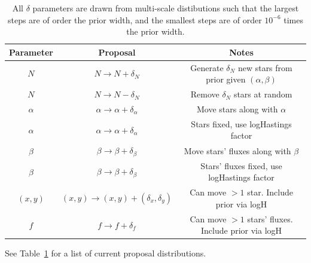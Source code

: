 \documentclass[letterpaper, 11pt]{article}
\begin{document}
\begin{table}
\begin{center}
\begin{tabular}{c|c|c}
Parameter & Proposal & Notes\\
\hline
$N$ & $N \to N + \delta_N$ & Generate $\delta_N$ new stars from prior given
$(\alpha, \beta)$\\
$N$ & $N \to N - \delta_N$ & Remove $\delta_N$ stars at random\\
$\alpha$ & $\alpha \to \alpha + \delta_\alpha$ & Move stars along with $\alpha$
\\
$\alpha$ & $\alpha \to \alpha + \delta_\alpha$ & Stars fixed, use logHastings
factor \\
$\beta$ & $\beta \to \beta + \delta_\beta$ & Move stars' fluxes along with
$\beta$\\
$\beta$ & $\beta \to \beta + \delta_\beta$ & Stars' fluxes fixed, use
logHastings factor \\
$(x,y)$ & $(x,y) \to (x,y)+(\delta_x, \delta_y)$ & Can move $>1$ star.
Include prior via logH \\
$f$ & $f \to f + \delta_f$ & Can move $>1$ stars' fluxes. Include prior
via logH
\end{tabular}
\end{center}
\caption{All $\delta$ parameters are drawn from multi-scale distibutions such
that the largest steps are of order the prior width, and the smallest steps
are of order $10^{-6}$ times the prior width.\label{proposals}}
\end{table}

See Table~\ref{proposals} for a list of current proposal distributions.


\end{document}
